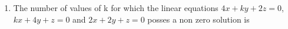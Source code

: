 \documentclass[journal,12pt,twocolumn]{IEEEtran}
\theoremstyle{remark}
\begin{document}
\begin{enumerate}
    \item The number of values of k for which the linear equations $4x + ky + 2z = 0$, $kx + 4y + z = 0$ and $2x + 2y + z=0$ posses a non zero solution is 
	\hfill{}
        \begin{enumerate}[label={(\alph*)}]
        \end{enumerate}

\end{enumerate}
\end{document}
